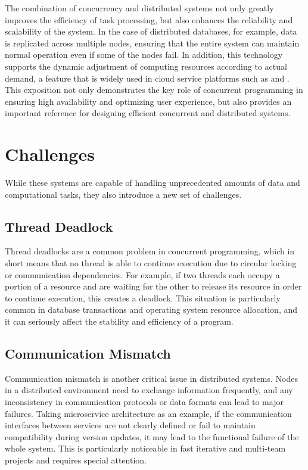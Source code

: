 \documentclass{l4proj}
\begin{document}
The combination of concurrency and distributed systems not only greatly improves the efficiency of task processing, but also enhances the reliability and scalability of the system. In the case of distributed databases, for example, data is replicated across multiple nodes, ensuring that the entire system can maintain normal operation even if some of the nodes fail. In addition, this technology supports the dynamic adjustment of computing resources according to actual demand, a feature that is widely used in cloud service platforms such as \cite{aws_2023_amazon} and \cite{microsoft_2023_cloud}. This exposition not only demonstrates the key role of concurrent programming in ensuring high availability and optimizing user experience, but also provides an important reference for designing efficient concurrent and distributed systems.

\section{Challenges}

While these systems are capable of handling unprecedented amounts of data and computational tasks, they also introduce a new set of challenges. 

\subsection{Thread Deadlock}

Thread deadlocks are a common problem in concurrent programming, which in short means that no thread is able to continue execution due to circular locking or communication dependencies. For example, if two threads each occupy a portion of a resource and are waiting for the other to release its resource in order to continue execution, this creates a deadlock. This situation is particularly common in database transactions and operating system resource allocation, and it can seriously affect the stability and efficiency of a program.

\subsection{Communication Mismatch}

Communication mismatch is another critical issue in distributed systems. Nodes in a distributed environment need to exchange information frequently, and any inconsistency in communication protocols or data formats can lead to major failures. Taking microservice architecture as an example, if the communication interfaces between services are not clearly defined or fail to maintain compatibility during version updates, it may lead to the functional failure of the whole system. This is particularly noticeable in fast iterative and multi-team projects and requires special attention.
\end{document}
